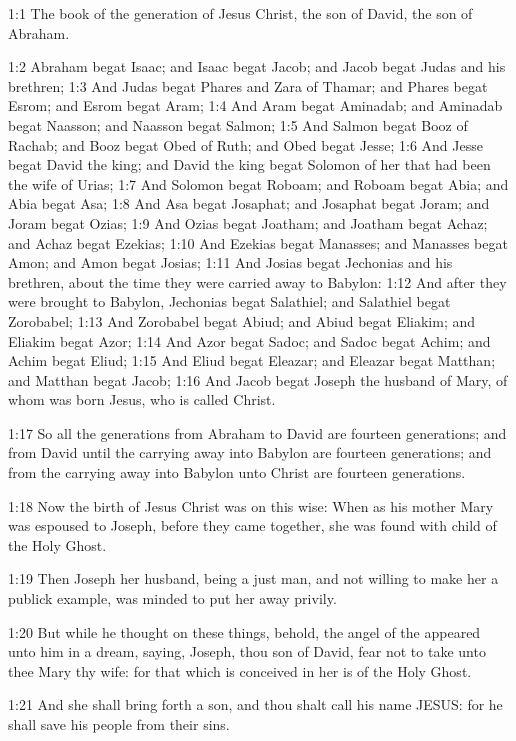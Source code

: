 

1:1 The book of the generation of Jesus Christ, the son of David, the
son of Abraham.

1:2 Abraham begat Isaac; and Isaac begat Jacob; and Jacob begat Judas
and his brethren; 1:3 And Judas begat Phares and Zara of Thamar; and
Phares begat Esrom; and Esrom begat Aram; 1:4 And Aram begat Aminadab;
and Aminadab begat Naasson; and Naasson begat Salmon; 1:5 And Salmon
begat Booz of Rachab; and Booz begat Obed of Ruth; and Obed begat
Jesse; 1:6 And Jesse begat David the king; and David the king begat
Solomon of her that had been the wife of Urias; 1:7 And Solomon begat
Roboam; and Roboam begat Abia; and Abia begat Asa; 1:8 And Asa begat
Josaphat; and Josaphat begat Joram; and Joram begat Ozias; 1:9 And
Ozias begat Joatham; and Joatham begat Achaz; and Achaz begat Ezekias;
1:10 And Ezekias begat Manasses; and Manasses begat Amon; and Amon
begat Josias; 1:11 And Josias begat Jechonias and his brethren, about
the time they were carried away to Babylon: 1:12 And after they were
brought to Babylon, Jechonias begat Salathiel; and Salathiel begat
Zorobabel; 1:13 And Zorobabel begat Abiud; and Abiud begat Eliakim;
and Eliakim begat Azor; 1:14 And Azor begat Sadoc; and Sadoc begat
Achim; and Achim begat Eliud; 1:15 And Eliud begat Eleazar; and
Eleazar begat Matthan; and Matthan begat Jacob; 1:16 And Jacob begat
Joseph the husband of Mary, of whom was born Jesus, who is called
Christ.

1:17 So all the generations from Abraham to David are fourteen
generations; and from David until the carrying away into Babylon are
fourteen generations; and from the carrying away into Babylon unto
Christ are fourteen generations.

1:18 Now the birth of Jesus Christ was on this wise: When as his
mother Mary was espoused to Joseph, before they came together, she was
found with child of the Holy Ghost.

1:19 Then Joseph her husband, being a just man, and not willing to
make her a publick example, was minded to put her away privily.

1:20 But while he thought on these things, behold, the angel of the
\LORD appeared unto him in a dream, saying, Joseph, thou son of David,
fear not to take unto thee Mary thy wife: for that which is conceived
in her is of the Holy Ghost.

1:21 And she shall bring forth a son, and thou shalt call his name
JESUS: for he shall save his people from their sins.

